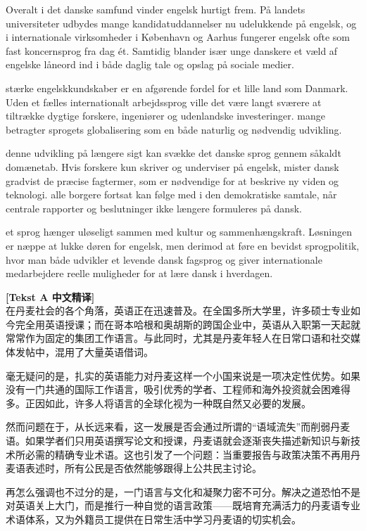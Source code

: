Overalt i det danske samfund vinder engelsk hurtigt frem. På landets universiteter udbydes mange kandidatuddannelser nu udelukkende på engelsk, og i internationale virksomheder i København og Aarhus fungerer engelsk ofte som fast koncernsprog fra dag ét. Samtidig blander især unge danskere et væld af engelske låneord ind i både daglig tale og opslag på sociale medier.

 stærke engelskkundskaber er en afgørende fordel for et lille land som Danmark. Uden et fælles internationalt arbejdssprog ville det være langt sværere at tiltrække dygtige forskere, ingeniører og udenlandske investeringer.  mange betragter sprogets globalisering som en både naturlig og nødvendig udvikling.

 denne udvikling på længere sigt kan svække det danske sprog gennem såkaldt domænetab. Hvis forskere kun skriver og underviser på engelsk, mister dansk gradvist de præcise fagtermer, som er nødvendige for at beskrive ny viden og teknologi.  alle borgere fortsat kan følge med i den demokratiske samtale, når centrale rapporter og beslutninger ikke længere formuleres på dansk.

 et sprog hænger uløseligt sammen med kultur og sammenhængskraft. Løsningen er næppe at lukke døren for engelsk, men derimod at føre en bevidst sprogpolitik, hvor man både udvikler et levende dansk fagsprog og giver internationale medarbejdere reelle muligheder for at lære dansk i hverdagen.

\begin{transbox}
\small
\textbf{\color{NCDTeal}[Tekst A 中文精译]}\\
在丹麦社会的各个角落，英语正在迅速普及。在全国多所大学里，许多硕士专业如今完全用英语授课；而在哥本哈根和奥胡斯的跨国企业中，英语从入职第一天起就常常作为固定的集团工作语言。与此同时，尤其是丹麦年轻人在日常口语和社交媒体发帖中，混用了大量英语借词。

毫无疑问的是，扎实的英语能力对丹麦这样一个小国来说是一项决定性优势。如果没有一门共通的国际工作语言，吸引优秀的学者、工程师和海外投资就会困难得多。正因如此，许多人将语言的全球化视为一种既自然又必要的发展。

然而问题在于，从长远来看，这一发展是否会通过所谓的“语域流失”而削弱丹麦语。如果学者们只用英语撰写论文和授课，丹麦语就会逐渐丧失描述新知识与新技术所必需的精确专业术语。这也引发了一个问题：当重要报告与政策决策不再用丹麦语表述时，所有公民是否依然能够跟得上公共民主讨论。

再怎么强调也不过分的是，一门语言与文化和凝聚力密不可分。解决之道恐怕不是对英语关上大门，而是推行一种自觉的语言政策——既培育充满活力的丹麦语专业术语体系，又为外籍员工提供在日常生活中学习丹麦语的切实机会。
\end{transbox}

